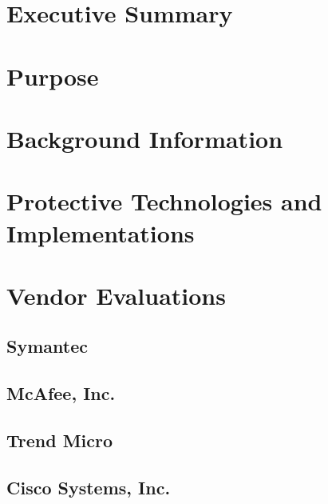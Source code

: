\documentclass[
	final,
	titlepage,
	narroweqnarray,
	12pt
	]{ieee}
\begin{document}
\section{Executive Summary}


\newpage
\section{Purpose}



\section{Background Information}
 

\section{Protective Technologies and Implementations}








\section{Vendor Evaluations}

\subsection{Symantec}

\subsection{McAfee, Inc.}


\subsection{Trend Micro}
	 
	 
\subsection{Cisco Systems, Inc.}

\end{document}

